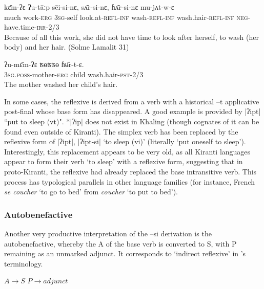 \documentclass[twoside,a4paper,11pt]{article}
\newcommand{\ipa}[1]{{\phon#1}}
\begin{document}
\begin{exe}
\ex \label{ex:sursi}
\gll \ipa{gʰole}  	\ipa{kɛ̄m-ʔɛ}  	\ipa{ʔu-tāːp}  	\ipa{sēi-si-nɛ,}  	\ipa{sʌ̄r-si-nɛ,}  	\ipa{ɦʌ̄r-si-nɛ}  	\ipa{mu-jʌt-w-ɛ}  \\
much work-\textsc{erg} \textsc{3sg}-self  look.at\textsc{-refl-inf} wash\textsc{-refl-inf} wash.hair\textsc{-refl-inf} \textsc{neg}-have.time-\textsc{irr}-2/3 \\
\glt Because of all this work, she did not have time to look after herself, to wash (her body) and her hair. (Solme Lamalit 31)
\end{exe}

\begin{exe}
\ex \label{ex:sur}
\gll
 \ipa{ʔu-mɛ̂m-ʔɛ}  	\ipa{ʦɵʦʦɵ}  	\ipa{ɦʉ̂r-t-ɛ.}  \\
\textsc{3sg.poss}-mother-\textsc{erg} child wash.hair-\textsc{pst}-2/3 \\
\glt The mother washed her child's hair.
\end{exe}
 
 In some cases, the reflexive is derived from a verb with a historical \ipa{--t} applicative post-final whose base form has disappeared. A good example is provided by |ʔipt| ``put to sleep (vt)".  *|ʔip| does not exist in Khaling (though cognates of it can be found even outside of Kiranti). The simplex verb has been replaced by the reflexive form of |ʔipt|, |ʔipt-si| `to sleep (vi)' (literally `put oneself to sleep'). Interestingly, this replacement appears to be very old, as all Kiranti languages appear to form their verb `to sleep' with a reflexive form, suggesting that in proto-Kiranti,  the reflexive had already replaced the base intransitive verb. This process has typological parallels in other language families (for instance, French \textit{se coucher} `to go to bed' from \textit{coucher} `to put to bed').
 
\subsubsection{Autobenefactive}

Another very productive interpretation of the  \ipa{--si} derivation is the autobenefactive, whereby the A of the base verb is converted to S, with  P remaining as an unmarked adjunct.   It corresponds to  `indirect reflexive' in \citet{kemmer93middle}'s terminology.
 
\begin{exe}
\ex \label{ex:autoben}
\glt $A  \rightarrow S$
\glt $P  \rightarrow adjunct$
\end{exe}
 
\end{document}
